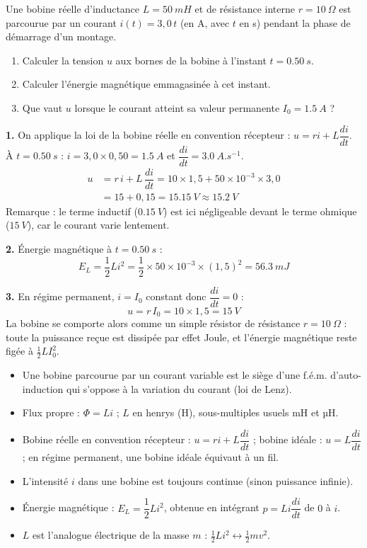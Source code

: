 \documentclass[11pt]{article}
\newcommand{\cle}[1]{{\popxbold\color{popdark}#1}}
\begin{document}
\begin{exoresolu}
Une bobine réelle d'inductance $L = \SI{50}{mH}$ et de résistance interne $r = \SI{10}{\Omega}$ est parcourue par un courant $i(t) = 3{,}0\,t$ (en A, avec $t$ en s) pendant la phase de démarrage d'un montage.
\begin{enumerate}
\item Calculer la tension $u$ aux bornes de la bobine à l'instant $t = \SI{0,50}{s}$.
\item Calculer l'énergie magnétique emmagasinée à cet instant.
\item Que vaut $u$ lorsque le courant atteint sa valeur permanente $I_0 = \SI{1,5}{A}$ ?
\end{enumerate}
\tcblower
\textbf{1.} On applique la loi de la bobine réelle en convention récepteur : $u = ri + L\dfrac{di}{dt}$.
À $t = \SI{0,50}{s}$ : $i = 3{,}0 \times 0{,}50 = \SI{1,5}{A}$ et $\dfrac{di}{dt} = \SI{3,0}{A.s^{-1}}$.
\begin{align*}
u &= r\,i + L\,\dfrac{di}{dt} = 10 \times 1{,}5 + 50\times 10^{-3} \times 3{,}0 \\
&= 15 + 0{,}15 = \SI{15,15}{V} \approx \SI{15,2}{V}
\end{align*}
Remarque : le terme inductif ($\SI{0,15}{V}$) est ici négligeable devant le terme ohmique ($\SI{15}{V}$), car le courant varie lentement.

\textbf{2.} Énergie magnétique à $t = \SI{0,50}{s}$ :
\[ E_L = \frac{1}{2}Li^2 = \frac{1}{2}\times 50\times 10^{-3}\times (1{,}5)^2 = \SI{56,3}{mJ} \]

\textbf{3.} En régime permanent, $i = I_0$ constant donc $\dfrac{di}{dt} = 0$ :
\[ u = r\,I_0 = 10 \times 1{,}5 = \SI{15}{V} \]
La bobine se comporte alors comme un simple résistor de résistance $r = \SI{10}{\Omega}$ : toute la puissance reçue est dissipée par effet Joule, et l'énergie magnétique reste figée à $\frac{1}{2}LI_0^2$.
\end{exoresolu}

\begin{aretenir}
\begin{itemize}
\item Une bobine parcourue par un courant variable est le siège d'une f.é.m. d'\cle{auto-induction} qui s'oppose à la variation du courant (loi de Lenz).
\item Flux propre : $\Phi = Li$ ; $L$ en henrys (H), sous-multiples usuels mH et µH.
\item Bobine réelle en convention récepteur : $u = ri + L\dfrac{di}{dt}$ ; bobine idéale : $u = L\dfrac{di}{dt}$ ; en régime permanent, une bobine idéale équivaut à un fil.
\item L'intensité $i$ dans une bobine est toujours \cle{continue} (sinon puissance infinie).
\item Énergie magnétique : $E_L = \dfrac{1}{2}Li^2$, obtenue en intégrant $p = Li\dfrac{di}{dt}$ de $0$ à $i$.
\item $L$ est l'analogue électrique de la masse $m$ : $\frac{1}{2}Li^2 \leftrightarrow \frac{1}{2}mv^2$.
\end{itemize}
\end{aretenir}
\end{document}
